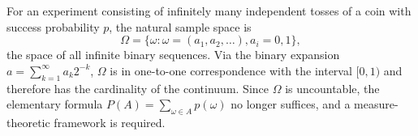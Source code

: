 For an experiment consisting of infinitely many independent tosses of a coin with success probability $p$, the natural sample space is
$$\Omega = \{\omega : \omega = (a_1, a_2, \ldots), a_i = 0, 1\},$$
the space of all infinite binary sequences. Via the binary expansion $a = \sum_{k=1}^{\infty} a_k 2^{-k}$, $\Omega$ is in one-to-one correspondence with the interval $[0, 1)$ and therefore has the cardinality of the continuum. Since $\Omega$ is uncountable, the elementary formula $P(A) = \sum_{\omega \in A} p(\omega)$ no longer suffices, and a measure-theoretic framework is required.
